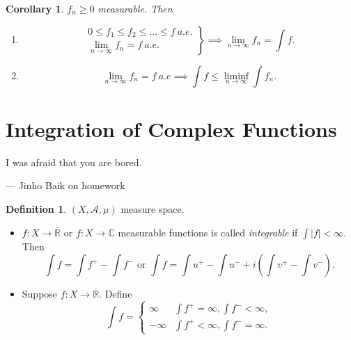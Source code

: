 \documentclass{report}
\newcommand{\R}{\mathbb{R}}
\newcommand{\C}{\mathbb{C}}
\newtheorem{corollary}[theorem]{Corollary}
\theoremstyle{definition}
\newtheorem{definition}[theorem]{Definition}
\theoremstyle{remark}
\begin{document}
\begin{corollary}
	$f_n \geq 0$ measurable. Then 
	\begin{enumerate}
		\item \[\left.\begin{array}{r}
			0 \leq f_1 \leq f_2 \leq  \ldots \leq f\ a.e. \\
			\lim_{n \to \infty} f_n = f\ a.e.
		\end{array}\right\} \implies \lim_{n \to \infty} f_n = \int f.\]
		\item \[
			\lim_{n \to \infty} f_n = f\ a.e \implies \int f \leq \liminf_{n \to \infty} \int f_n.	
		\]
	\end{enumerate}
\end{corollary}

\section{Integration of Complex Functions}
\epigraph{I was afraid that you are bored.}{--- \textup{Jinho Baik on homework}}
\begin{definition}
	$(X, \mathcal{A}, \mu)$ measure space. \begin{itemize}
		\item $f:X \to \overline{\R}$ or $f: X \to \C$ measurable functions is called \emph{integrable} if $\int |f| < \infty$. Then \[\int f = \int f^+ - \int f^- \text{ or } \int f = \int u^+ - \int u^- + i\left(\int v^+ - \int v^-\right).\]
		\item Suppose $f: X \to \overline{\R}$. Define \[\int f = \begin{cases}
			\infty & \displaystyle \int f^+ = \infty, \int f^- < \infty, \\[1em]
			-\infty & \displaystyle  \int f^+ < \infty, \int f^- = \infty.
		\end{cases}\]
	\end{itemize}
\end{definition}
\end{document}
